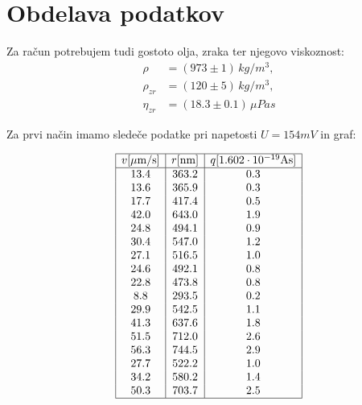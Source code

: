 \documentclass[12pt]{report}
\begin{document}
\endgroup


\chapter*{Obdelava podatkov}

Za račun potrebujem tudi gostoto olja, zraka ter njegovo viskoznost: 
\begin{align*}
  \rho &= (973 \pm 1)\,\si{kg/m^3}, \\
  \rho_{zr} &= (120 \pm 5)\,\si{kg/m^3}, \\
  \eta_{zr} &= (18.3 \pm 0.1)\,\si{\mu Pas}
\end{align*}

Za prvi način imamo sledeče podatke pri napetosti $U = 154mV$ in graf: 

\begin{tabela}[H]
  \centering
  \[
      \begin{array}{|c|c|c|} \hline
      v [\si{\mu m /s}] & r [\si{nm}] & q [1.602 \cdot 10^{-19} \si{As}] \\ \hline 
      13.4 &   363.2 &     0.3\\
      13.6 &   365.9 &     0.3\\
      17.7 &   417.4 &     0.5\\
      42.0 &   643.0 &     1.9\\
      24.8 &   494.1 &     0.9\\
      30.4 &   547.0 &     1.2\\
      27.1 &   516.5 &     1.0\\
      24.6 &   492.1 &     0.8\\
      22.8 &   473.8 &     0.8\\
       8.8 &   293.5 &     0.2\\
      29.9 &   542.5 &     1.1\\
      41.3 &   637.6 &     1.8\\
      51.5 &   712.0 &     2.6\\
      56.3 &   744.5 &     2.9\\
      27.7 &   522.2 &     1.0\\
      34.2 &   580.2 &     1.4\\
      50.3 &   703.7 &     2.5 \\ \hline
    \end{array}
  \]
\end{tabela}
\end{document}
